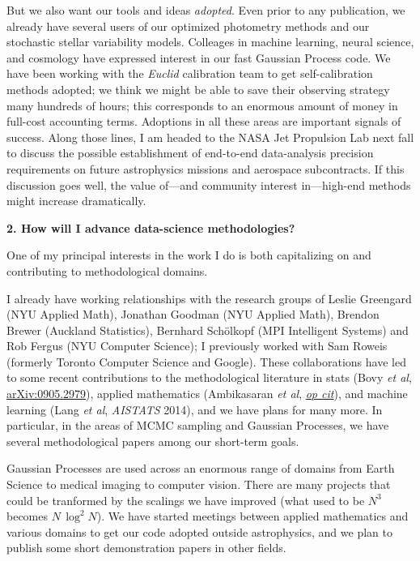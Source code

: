 \documentclass[11pt, letterpaper]{article}
\newcommand{\arxiv}[1]{\href{http://arxiv.org/abs/#1}{arXiv:#1}}
\newcommand{\opcit}[1]{\href{http://arxiv.org/abs/#1}{\textit{op cit}}}
\begin{document}
But we also want our tools and ideas \emph{adopted}.
Even prior to any publication, we already have several users of our
optimized photometry methods and our stochastic stellar variability
models.
Colleages in machine learning, neural science, and cosmology have
expressed interest in our fast Gaussian Process code.
We have been working with the \textsl{Euclid} calibration team to get
self-calibration methods adopted; we think we might be able to save
their observing strategy many hundreds of hours; this corresponds to an
enormous amount of money in full-cost accounting terms.
Adoptions in all these areas are important signals of success.
Along those lines, I am headed to the NASA Jet Propulsion Lab next
fall to discuss the possible establishment of end-to-end data-analysis
precision requirements on future astrophysics missions and aerospace
subcontracts.
If this discussion goes well, the value of---and community interest
in---high-end methods might increase dramatically.

\bigskip
\noindent\textbf{2. How will I advance data-science methodologies?}
\smallskip

One of my principal interests in the work I do is both capitalizing on
and contributing to methodological domains.

I already have working relationships with the research groups of
Leslie Greengard (NYU Applied Math), Jonathan Goodman (NYU Applied
Math), Brendon Brewer (Auckland Statistics), Bernhard Sch\"olkopf (MPI
Intelligent Systems) and Rob Fergus (NYU Computer Science); I
previously worked with Sam Roweis (formerly Toronto Computer Science and Google).
These collaborations have led to some recent contributions to
the methodological literature in stats (Bovy \textit{et al},
\arxiv{0905.2979}), applied mathematics (Ambikasaran \textit{et al},
\opcit{1403.6015}), and machine learning (Lang \textit{et al},
\textit{AISTATS} 2014), and we have plans for many more.
In particular, in the areas of MCMC sampling and Gaussian Processes,
we have several methodological papers among our short-term goals.

Gaussian Processes are used across an enormous range of domains from
Earth Science to medical imaging to computer vision.
There are many projects that could be tranformed by the scalings we
have improved (what used to be $N^3$ becomes $N\,\log^2N$).
We have started meetings between applied mathematics and various
domains to get our code adopted outside astrophysics, and we plan to
publish some short demonstration papers in other fields.
\end{document}
